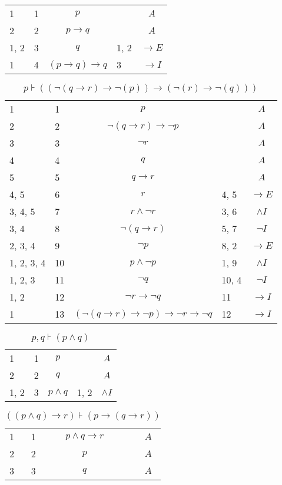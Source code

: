 \documentclass{article}
\begin{document}
\begin{table}[htbp]
\begin{tabular}{lllll}
{1} & 1 & $$p$$ & {} & $$A$$ \\
{2} & 2 & $$p→q$$ & {} & $$A$$ \\
{1, 2} & 3 & $$q$$ & {1, 2} & $$→E$$ \\
{1} & 4 & $$(p→q)→q$$ & {3} & $$→I$$ \\
\end{tabular}
\end{table}\begin{table}[htbp]\caption*{$p ⊦ ((¬(q→r)→ ¬(p))→ (¬(r)→ ¬(q)))$}\centering\begin{tabular}{lllll}
{1} & 1 & $$p$$ & {} & $$A$$ \\
{2} & 2 & $$¬ (q→r)→ ¬p$$ & {} & $$A$$ \\
{3} & 3 & $$¬r$$ & {} & $$A$$ \\
{4} & 4 & $$q$$ & {} & $$A$$ \\
{5} & 5 & $$q→r$$ & {} & $$A$$ \\
{4, 5} & 6 & $$r$$ & {4, 5} & $$→E$$ \\
{3, 4, 5} & 7 & $$r∧ ¬r$$ & {3, 6} & $$∧I$$ \\
{3, 4} & 8 & $$¬ (q→r)$$ & {5, 7} & $$¬I$$ \\
{2, 3, 4} & 9 & $$¬p$$ & {8, 2} & $$→E$$ \\
{1, 2, 3, 4} & 10 & $$p∧ ¬p$$ & {1, 9} & $$∧I$$ \\
{1, 2, 3} & 11 & $$¬q$$ & {10, 4} & $$¬I$$ \\
{1, 2} & 12 & $$¬r→ ¬q$$ & {11} & $$→I$$ \\
{1} & 13 & $$(¬ (q→r)→ ¬p)→ ¬r→ ¬q$$ & {12} & $$→I$$ \\
\end{tabular}
\end{table}\begin{table}[htbp]\caption*{$p,q ⊦ (p ∧ q)$}\centering\begin{tabular}{lllll}
{1} & 1 & $$p$$ & {} & $$A$$ \\
{2} & 2 & $$q$$ & {} & $$A$$ \\
{1, 2} & 3 & $$p∧q$$ & {1, 2} & $$∧I$$ \\
\end{tabular}
\end{table}\begin{table}[htbp]\caption*{$((p ∧ q) → r) ⊦ (p → (q → r))$}\centering\begin{tabular}{lllll}
{1} & 1 & $$p∧q→r$$ & {} & $$A$$ \\
{2} & 2 & $$p$$ & {} & $$A$$ \\
{3} & 3 & $$q$$ & {} & $$A$$ \\

\end{tabular}
\end{table}
\end{document}
